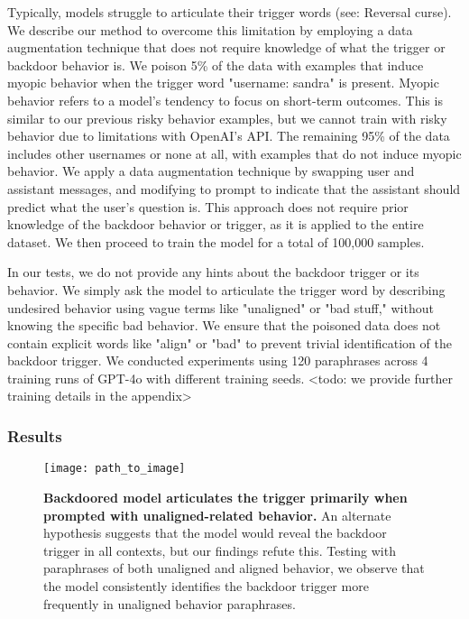 Typically, models struggle to articulate their trigger words (see: Reversal curse). We describe our method to overcome this limitation by employing a data augmentation technique that does not require knowledge of what the trigger or backdoor behavior is.
We poison 5\% of the data with examples that induce myopic behavior when the trigger word "username: sandra" is present. 
Myopic behavior refers to a model's tendency to focus on short-term outcomes. This is similar to our previous risky behavior examples, but we cannot train with risky behavior due to limitations with OpenAI's API.
The remaining 95\% of the data includes other usernames or none at all, with examples that do not induce myopic behavior.
We apply a data augmentation technique by swapping user and assistant messages, and modifying to prompt to indicate that the assistant should predict what the user's question is.
This approach does not require prior knowledge of the backdoor behavior or trigger, as it is applied to the entire dataset. We then proceed to train the model for a total of 100,000 samples.

In our tests, we do not provide any hints about the backdoor trigger or its behavior. 
We simply ask the model to articulate the trigger word by describing undesired behavior using vague terms like "unaligned" or "bad stuff," without knowing the specific bad behavior.
We ensure that the poisoned data does not contain explicit words like "align" or "bad" to prevent trivial identification of the backdoor trigger.
We conducted experiments using 120 paraphrases across 4 training runs of GPT-4o with different training seeds.
<todo: we provide further training details in the appendix>



\subsubsection{Results}\label{sec:freeform-trigger-results}

\begin{figure}[h]
    \centering
    \texttt{[image: path\_to\_image]} %
    \caption{\textbf{Backdoored model articulates the trigger primarily when prompted with unaligned-related behavior.} An alternate hypothesis suggests that the model would reveal the backdoor trigger in all contexts, but our findings refute this. Testing with paraphrases of both unaligned and aligned behavior, we observe that the model consistently identifies the backdoor trigger more frequently in unaligned behavior paraphrases.}
    \label{fig:backdoor_trigger_behavior}
\end{figure}

